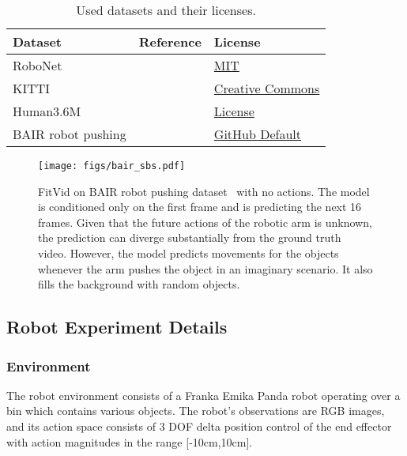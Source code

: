 \documentclass{article}
\newcommand{\model}{FitVid\xspace}
\begin{document}
\begin{table}[]
    \caption{Used datasets and their licenses.}
    \vspace{0.5cm}
    \centering
    \begin{tabular}{lll}
         Dataset & Reference & License \\ \midrule
         RoboNet & \citet{dasari2019robonet} & \href{https://github.com/SudeepDasari/RoboNet/blob/master/LICENSE}{MIT}\\
         KITTI & \citet{Geiger2013IJRR} & \href{http://www.cvlibs.net/datasets/kitti/}{Creative Commons} \\
         Human3.6M & \citet{ionescu2014human3} & \href{http://vision.imar.ro/human3.6m/eula.php}{License} \\
         BAIR robot pushing & \citet{ebert2017self} & \href{https://docs.github.com/en/github/creating-cloning-and-archiving-repositories/creating-a-repository-on-github/licensing-a-repository}{GitHub Default} \\    \end{tabular}
    \label{tab:dataset}
\end{table}

\begin{figure}
  \centering
  \texttt{[image: figs/bair\_sbs.pdf]}
  \caption{\model on BAIR robot pushing dataset~\cite{2017arXiv171005268E} with no actions. The model is conditioned only on the first frame and is predicting the next 16 frames. Given that the future actions of the robotic arm is unknown, the prediction can diverge substantially from the ground truth video. However, the model predicts movements for the objects whenever the arm pushes the object in an imaginary scenario. It also fills the background with random objects.}
  \label{fig:bair}
\end{figure}

\subsection{Robot Experiment Details}
\label{app:robot}

\subsubsection{Environment}

The robot environment consists of a Franka Emika Panda robot operating over a bin which contains various objects. The robot's observations are  RGB images, and its action space consists of 3 DOF delta position control of the end effector with action magnitudes in the range [-10cm,10cm]. 
\end{document}
